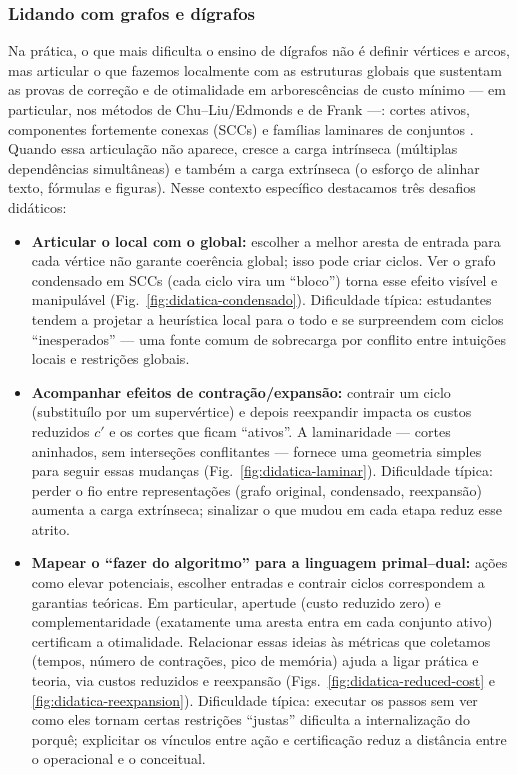 \documentclass[12pt,a4paper]{article}
\def\emph#1{#1}%
\begin{document}
\subsubsection{Lidando com grafos e dígrafos}
Na prática, o que mais dificulta o ensino de dígrafos não é definir vértices e arcos, mas articular o que fazemos localmente com as estruturas globais que sustentam as provas de correção e de otimalidade em arborescências de custo mínimo — em particular, nos métodos de Chu–Liu/Edmonds e de Frank —: cortes ativos, componentes fortemente conexas (SCCs) e famílias laminares de conjuntos \cite{bondy2008graph,diestel2017graph,west2001introduction}. Quando essa articulação não aparece, cresce a \emph{carga intrínseca} (múltiplas dependências simultâneas) e também a \emph{carga extrínseca} (o esforço de alinhar texto, fórmulas e figuras). Nesse contexto específico destacamos três desafios didáticos:
\begin{itemize}\setlength{\itemsep}{2pt}
    \item \textbf{Articular o local com o global:} escolher a melhor aresta de entrada para cada vértice não garante coerência global; isso pode criar ciclos. Ver o grafo \emph{condensado} em SCCs (cada ciclo vira um ``bloco'') torna esse efeito visível e manipulável (Fig.~\ref{fig:didatica-condensado}). \emph{Dificuldade típica:} estudantes tendem a projetar a heurística local para o todo e se surpreendem com ciclos “inesperados” — uma fonte comum de sobrecarga por conflito entre intuições locais e restrições globais.
    \item \textbf{Acompanhar efeitos de contração/expansão:} contrair um ciclo (substituí\-lo por um supervértice) e depois reexpandir impacta os custos reduzidos \(c'\) e os cortes que ficam ``ativos''. A laminaridade — cortes aninhados, sem interseções conflitantes — fornece uma geometria simples para seguir essas mudanças (Fig.~\ref{fig:didatica-laminar}). \emph{Dificuldade típica:} perder o fio entre representações (grafo original, condensado, reexpansão) aumenta a carga extrínseca; sinalizar o que mudou em cada etapa reduz esse atrito.
    \item \textbf{Mapear o ``fazer do algoritmo'' para a linguagem primal–dual:} ações como elevar potenciais, escolher entradas e contrair ciclos correspondem a garantias teóricas. Em particular, \emph{apertude} (custo reduzido zero) e \emph{complementaridade} (exatamente uma aresta entra em cada conjunto ativo) certificam a otimalidade. Relacionar essas ideias às métricas que coletamos (tempos, número de contrações, pico de memória) ajuda a ligar prática e teoria, via custos reduzidos e reexpansão (Figs.~\ref{fig:didatica-reduced-cost} e \ref{fig:didatica-reexpansion}). \emph{Dificuldade típica:} executar os passos sem ver como eles tornam certas restrições “justas” dificulta a internalização do porquê; explicitar os vínculos entre ação e certificação reduz a distância entre o operacional e o conceitual.
\end{itemize}
\end{document}
